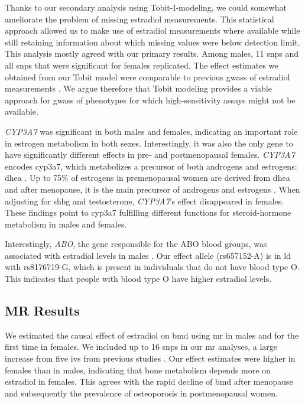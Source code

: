 \documentclass[twoside=false]{scrbook}
\begin{document}
Thanks to our secondary analysis using Tobit-I-modeling, we could somewhat ameliorate the problem of missing estradiol measurements.
This statistical approach allowed us to make use of estradiol measurements where available while still retaining information about which missing values were below detection limit.
This analysis mostly agreed with our primary results.
Among males, 11 \glspl{snp} and all \glspl{snp} that were significant for females replicated.
The effect estimates we obtained from our Tobit model were comparable to previous \glspl{gwas} of estradiol measurements \cite{Prescott2012f, Eriksson2018b,Pott2019e}.
We argue therefore that Tobit modeling provides a viable approach for \glspl{gwas} of phenotypes for which high-sensitivity assays might not be available.

\textit{CYP3A7} was significant in both males and females, indicating an important role in estrogen metabolism in both sexes.
Interestingly, it was also the only gene to have significantly different effects in pre- and postmenopausal females.
\textit{CYP3A7} encodes \gls{cyp3a7}, which metabolizes a precursor of both androgens and estrogens: \gls{dhea} \cite{Ohmori1998}.
Up to 75\% of estrogens in premenopausal women are derived from \gls{dhea} and after menopause, it is the main precursor of androgens and estrogens \cite{Simpson2001}.
When adjusting for \gls{shbg} and testosterone, \textit{CYP3A7}'s effect disappeared in females.
These findings point to \gls{cyp3a7} fulfilling different functions for steroid-hormone metabolism in males and females.

Interestingly, \textit{ABO}, the gene responsible for the ABO blood groups, was associated with estradiol levels in males \cite{Ogasawara1996}.
Our effect allele (rs657152-A) is in \gls{ld} with rs8176719-G, which is present in individuals that do not have blood type O.
This indicates that people with blood type O have higher estradiol levels.

\subsection{MR Results}
We estimated the causal effect of estradiol on \gls{bmd} using \gls{mr} in males and for the first time in females.
We included up to 16 \glspl{snp} in our \gls{mr} analyses, a large increase from five \glspl{iv} from previous studies \cite{Nethander2018a}.
Our effect estimates were higher in females than in males, indicating that bone metabolism depends more on estradiol in females.
This agrees with the rapid decline of \gls{bmd} after menopause and subsequently the prevalence of osteoporosis in postmenopausal women.
\end{document}
